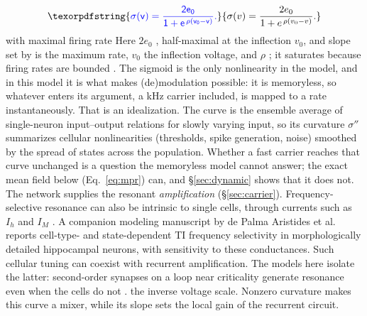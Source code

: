\documentclass[11pt,a4paper]{article}
\newcommand{\Sig}{\sigma}
\providecommand{\DIFaddtex}[1]{{\protect\color{blue} \sf #1}} %
\providecommand{\DIFdeltex}[1]{{\protect\color{red} \scriptsize #1}} %
\providecommand{\DIFaddbegin}{} %
\providecommand{\DIFaddend}{} %
\providecommand{\DIFdelbegin}{} %
\providecommand{\DIFdelend}{} %
\providecommand{\DIFadd}[1]{\texorpdfstring{\DIFaddtex{#1}}{#1}} %
\providecommand{\DIFdel}[1]{\texorpdfstring{\DIFdeltex{#1}}{}} %
\begin{document}
\DIFdelend \DIFaddbegin \begin{equation}
\DIFadd{\Sig(v)=\frac{2e_0}{1+e^{\,\rho(v_0-v)}} .
\label{eq:sigmoid}
}\end{equation}\DIFaddend
\DIFdelbegin \DIFdel{with maximal firing rate }\DIFdelend \DIFaddbegin \DIFadd{Here }\DIFaddend $2e_0$ \DIFdelbegin \DIFdel{, half-maximal at the inflection $v_0$, and slope set by
}\DIFdelend \DIFaddbegin \DIFadd{is the maximum rate, $v_0$ the inflection voltage, and }\DIFaddend $\rho$ \DIFdelbegin \DIFdel{; it saturates because firing rates are bounded \cite{ruffini2025rosetta}. The sigmoid is
the only nonlinearity in the model, and in this model it is what makes (de)modulation
possible: it is memoryless, so whatever enters its argument, a kHz carrier included, is
mapped to a rate instantaneously. That is an idealization. The curve is the ensemble
average of single-neuron input--output relations for slowly varying input, so its curvature
$\Sig''$ summarizes cellular nonlinearities (thresholds, spike generation, noise) smoothed
by the spread of states across the population. Whether a fast carrier reaches that curve
unchanged is a question the memoryless model cannot answer; the exact mean field below
(Eq.~\eqref{eq:mpr}) can, and \S\ref{sec:dynamic} shows that it does not. The network
supplies the resonant \emph{amplification} (\S\ref{sec:carrier}). Frequency-selective
resonance can also be intrinsic to single cells, through currents such as $I_h$ and $I_M$
\cite{hutcheonyarom2000}. A companion modeling manuscript by de Palma Aristides et al.\
\cite{depalma2026ti} reports cell-type- and state-dependent TI frequency selectivity in
morphologically detailed hippocampal neurons, with sensitivity to these conductances.
Such cellular tuning can coexist with recurrent amplification.
The models here isolate
the latter: second-order synapses on a loop near criticality generate resonance even
when the cells do not \cite{brunelhakim1999,brunelwang2003}.
}\DIFdelend \DIFaddbegin \DIFadd{the inverse
voltage scale. Nonzero curvature makes this curve a mixer, while its slope sets
the local gain of the recurrent circuit.
}\DIFaddend
\end{document}
